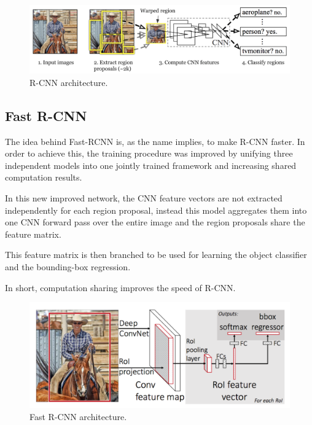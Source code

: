     \begin{figure}[htb]
        \centering
        \includegraphics[scale = 0.3]{Sections/2StateOfTheArt/2_images/RCNN.png}
        \caption{R-CNN architecture. \cite{weng2017detection3}} 
    \end{figure}

    \subsection{Fast R-CNN}

    \par The idea behind Fast-RCNN \cite{girshick2015fast} is, as the name implies, to make  R-CNN faster. In order to achieve this, the training procedure was improved by unifying three independent models into one jointly trained framework and increasing shared computation results.
    \par In this new improved network, the CNN feature vectors are not extracted independently for each region proposal, instead this model aggregates them into one CNN forward pass over the entire image and the region proposals share the feature matrix.
    \par This feature matrix is then branched to be used for learning the object classifier and the bounding-box regression.
    \par In short, computation sharing improves the speed of R-CNN. \cite{weng2017detection3}

    \begin{figure}[htb]
        \centering
        \includegraphics[scale = 0.15]{Sections/2StateOfTheArt/2_images/fast-RCNN.png}
        \caption{Fast R-CNN architecture. \cite{weng2017detection3}} 
    \end{figure}

